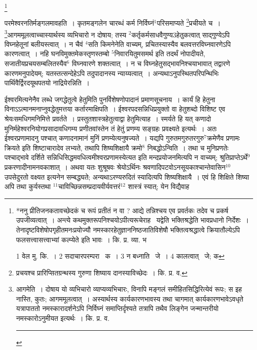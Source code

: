\documentclass[11pt, openany]{book}
\newcommand\blfootnote[1]{%
 \begingroup
 \renewcommand\thefootnote{}\footnote{#1}%
 \addtocounter{footnote}{-1}%
 \endgroup
}
\begin{document}
\blfootnote{*ननु प्रीतिजनकतावच्छेदकं च रूपं प्रतीतं न वा ? आद्ये तन्निश्चय एव प्रवर्तकः तदेव च प्रकर्ष उपजीव्यत्वात्~। अन्त्ये कथमुक्तरूपनिश्चयोऽपीत्यरूचेराह \textendash\ यद्वेति भक्तिश्रद्धेति भावप्रधानो निर्देशः~। तेनादृष्टविशेषोपगृहीतमनःप्रयोज्यौ नमस्कारहेतुज्ञाननिष्ठजातिविशेषौ भक्तित्वश्रद्धात्वे क्रियातौल्येऽपि फलसत्त्वासत्त्वाभ्यां कल्प्येते इति भावः~। कि. प्र. व्या. भ

1 वेल मु. कि.~। 2 सदाचारपरम्परा  \textendash\ क~। 3 न बध्नाति  \textendash\ जे~। 4 कालत्वात्  \textendash\ जे; क}

\newpage
\begin{sloppypar}
\noindent
परमेश्वरनतिर्मङ्गलमावहति~। कृतमङ्गलेन चारब्धं कर्म निर्विघ्नं${}^1$परिसमाप्यते \renewcommand{\thefootnote}{१}\footnote{प्रचयश्च प्रारिप्सितग्रन्थस्य गुरुणा शिष्याय दानस्याविच्छेदः~। कि. प्र. व.}प्रचीयते च~। \renewcommand{\thefootnote}{२}\footnote{आगमेति~। दोषाय यो व्यभिचारो व्याप्यव्यभिचारः, विनापि मङ्गलं समीहितसिद्धिरित्येवं रूपः; स इह नास्ति, कुतः; आगममूलत्वात्~। अस्यार्थस्य कार्यकारणभावस्य तथा चागमात् कार्यकारणभावेऽवधृते यत्रापाततो नमस्कारादर्शनेऽपि निर्विघ्नं समाप्तिर्दृश्यते तत्रापि तथैव लिङ्गेन जन्मान्तरीयो नमस्कारोऽनुमीयत इत्यर्थः~। कि. प्र. व. \rule{0.4\linewidth}{0.5pt}}आगममूलत्वाच्चास्यार्थस्य व्यभिचारो न दोषाय; तस्य ${}^2$कर्तृकर्मसाधवैगुण्य3हेतुकत्वात् साद्गुण्येऽपि विघ्नहेतूनां बलीयस्त्वात्~। न चैवं ${}^4$सति किमनेनेति वाच्यम्, प्रचितस्यास्यैव बलवत्तरविघ्नवारणेऽपि कारणत्वात्~। नहि घनविमुक्तमेकस्तृणस्तम्बो ${}^5$निवारयितुमसमर्थ इति तदर्थं नोपादीयते, सजातीयप्रचयसम्बलितस्यैव$^6$ विघ्नवारणे शक्तत्वात्~। न च विघ्नहेतुसद्भावनिश्चयाभावात् तद्वारणे कारणमनुपादेयम्; यतस्तत्सन्देहेऽपि तदुपादानस्य न्याय्यत्वात्~। अन्यथाऽनुपस्थितपरिपन्थिभिः पार्थिवैर्द्विरदयूथपतयो नाद्रियेरन्निति~।
\end{sloppypar}

{\knu ईश्वर}मित्यनेनैव लब्धे जगद्धेतुत्वे {\knu हेतु}मिति पुनर्विशेषणोपादानं प्रमाणसूचनाय~। कार्यं हि हेतुना विनाऽऽत्मानमनाप्नुवद्धेतुमत्तया कर्तारमाक्षिपति~। ईश्वरपदसन्निधिप्रयुक्तो वा हेतुशब्दो विशिष्ट एव श्रेयःसमधिगमनिमित्ते प्रवर्तते~। प्रस्तुतशास्त्रहेतुत्वाद्वा हेतुमित्याह~। स्मर्यते हि यत् {\knu कणादो} मुनिर्महेश्वरनियोगप्रसादावधिगम्य प्रणीतवांस्तेन तं {\knu हेतुं प्रणम्य सङ्ग्रहः प्रवक्ष्य}ते इत्यर्थः~। {\knu अतः} ईश्वरप्रणामादनु पश्चात् {\knu कणाद}नामानं मुनिं प्रणम्येत्यनुषज्यते~। यद्यपि गुरुतमगुरुतरगुरु$^7$क्रमेणैव प्रणामः क्रियते इति शिष्टाचारादेव लभ्यते, तथापि शिष्यशिक्षायै क्रमो$^8$ निबद्धोऽन्विति~। तथा च मुनिप्रणतेः पश्चाद्भावे दर्शिते सन्निधिसिद्धमवधित्वमीश्वरप्रणामस्येत्यत इति मन्दप्रयोजनमित्यपि न वाच्यम्; श्रुतिप्राप्तेऽर्थे$^9$ प्रकरणादीनामनवकाशात्~। अथवा यतः शुश्रूषवः श्रेयोऽर्थिनः श्रवणादिपटवोऽनसूयकाश्चान्तेवासिन$^10$ उपसेदुरतो वक्ष्यत इत्यनेन सम्बद्ध्यते; अन्यथाऽरण्यरुदितं स्यादित्यपि शिष्यशिक्षायै~। एवं हि शिक्षिते शिष्या अपि तथा कुर्यस्तथा ${}^11$चाविच्छिन्नसम्प्रदायवीर्यवत्तरं$^12$ शास्त्रं स्यात्; येन विद्यैवाह \textendash
\end{document}
